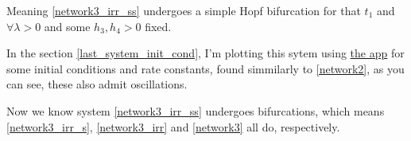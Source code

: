 Meaning \ref{network3_irr_ss} undergoes a simple Hopf bifurcation for that $t_1$ and $\forall \lambda > 0$ and some $h_3, h_4 > 0$ fixed.

In the section \ref{last_system_init_cond}, I'm plotting this sytem using \href{https://github.com/viktorashi/bachelor-thesis.git}{the app} for some initial conditions and rate constants, found simmilarly to \ref{network2}, as you can see, these also admit oscillations.

Now we know system \ref{network3_irr_ss} undergoes bifurcations, which means \ref{network3_irr_s}, \ref{network3_irr} and \ref{network3} all do, respectively.
